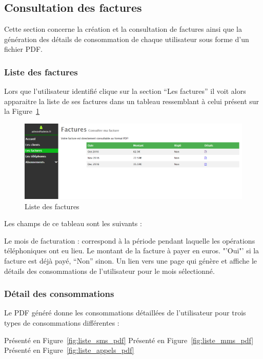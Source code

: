 \subsection{Consultation des factures}
Cette section concerne la création et la consultation de factures ainsi que la génération des détails de consommation de chaque utilisateur sous forme d'un fichier PDF.
\subsubsection{Liste des factures}
Lors que l'utilisateur identifié clique sur la section "`Les factures"' il voit alors apparaitre la liste de ses factures dans un tableau ressemblant à celui présent sur la Figure~\ref{fig:listfacture}

\begin{figure}[ht]
  \centering
    \includegraphics[width=.55\textwidth]{images/Plateforme/liste_factures}
    \caption{Liste des factures}
    \label{fig:listfacture}
\end{figure}

Les champs de ce tableau sont les suivants :
\begin{itemize}
  Le mois de facturation : correspond à la période pendant laquelle les opérations téléphoniques ont eu lieu.
  Le montant de la facture à payer en euros.
  "'Oui"' si la facture est déjà payé, "`Non"' sinon.
  Un lien vers une page qui génère et affiche le détails des consommations de l'utilisateur pour le mois sélectionné.
\end{itemize}

\subsubsection{Détail des consommations}

Le PDF généré donne les consommations détaillées de l'utilisateur pour trois types de consommations différentes :
\begin{itemize}
	Présenté en Figure~\ref{fig:liste_sms_pdf}
	Présenté en Figure~\ref{fig:liste_mms_pdf}
	Présenté en Figure~\ref{fig:liste_appels_pdf}
\end{itemize}

